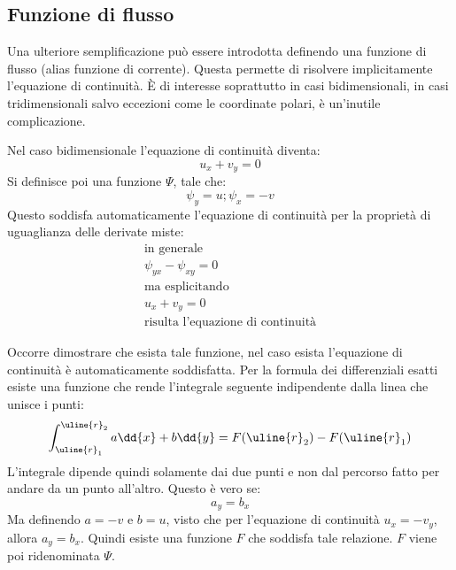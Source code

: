 \subsection{Funzione di flusso}
Una ulteriore semplificazione può essere introdotta definendo una funzione di flusso (alias funzione di corrente).
Questa permette di risolvere implicitamente l'equazione di continuità. 
È di interesse soprattutto in casi bidimensionali, in casi tridimensionali salvo eccezioni come le coordinate polari, è un'inutile complicazione.

Nel caso bidimensionale l'equazione di continuità diventa:
%
	\begin{equation*}
		u_x + v_y = 0
	\end{equation*}
%
Si definisce poi una funzione $\Psi$, tale che:
%
	\begin{equation*}
		\psi_y = u; \psi_x = -v
	\end{equation*}
%
Questo soddisfa automaticamente l'equazione di continuità per la proprietà di uguaglianza delle derivate miste:
%
	\begin{equation*}
		\begin{gathered}
			\text{in generale}\\
			\psi_{yx} - \psi_{xy} = 0\\
			\text{ma esplicitando}\\
			u_x + v_y = 0\\
			\text{risulta l'equazione di continuità}
		\end{gathered}
	\end{equation*}
%
	
Occorre dimostrare che esista tale funzione, nel caso esista l'equazione di continuità è automaticamente soddisfatta.
Per la formula dei differenziali esatti esiste una funzione che rende l'integrale seguente indipendente dalla linea che unisce i punti:
%
	\begin{equation*}
		\int_{\uline{r}_1}^{\uline{r}_2} a \dd{x} + b \dd{y} = F(\uline{r}_2) - F(\uline{r}_1)
	\end{equation*}
%
L'integrale dipende quindi solamente dai due punti e non dal percorso fatto per andare da un punto all'altro.
Questo è vero se:
%
	\begin{equation*}
		a_y = b_x
	\end{equation*}
%
Ma definendo $a = -v$ e $b = u$, visto che per l'equazione di continuità $u_x = -v_y$, allora $a_y = b_x$.
Quindi esiste una funzione $F$ che soddisfa tale relazione.
$F$ viene poi ridenominata $\Psi$.


